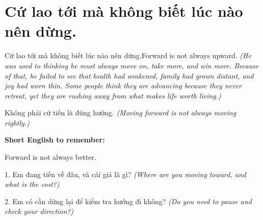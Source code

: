 \section{Cứ lao tới mà không biết lúc nào nên dừng.}
\begin{truyen}{Cứ lao tới mà không biết lúc nào nên dừng.}{Forward is not always upward.}
\textit{(He was used to thinking he must always move on, take more, and win more. Because of that, he failed to see that health had weakened, family had grown distant, and joy had worn thin. Some people think they are advancing because they never retreat, yet they are rushing away from what makes life worth living.)}
\end{truyen}
\begin{baihoc}
Không phải cứ tiến là đúng hướng.
\textit{(Moving forward is not always moving rightly.)}
\end{baihoc}
\begin{ghinhoanh}
\textbf{Short English to remember:}

Forward is not always better.
\end{ghinhoanh}
\begin{tuhocnhanh}
1. Em đang tiến về đâu, và cái giá là gì? \textit{(Where are you moving toward, and what is the cost?)}

2. Em có cần dừng lại để kiểm tra hướng đi không? \textit{(Do you need to pause and check your direction?)}
\end{tuhocnhanh}
\ngancach

